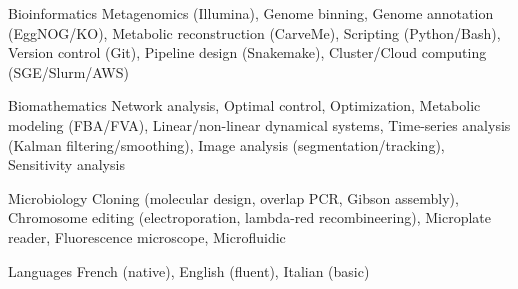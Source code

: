 

\begin{cvskills}

  \cvskill
    {Bioinformatics} %
    {Metagenomics (Illumina), Genome binning, Genome annotation (EggNOG/KO), Metabolic reconstruction (CarveMe), \linebreak Scripting (Python/Bash), Version control (Git), Pipeline design (Snakemake), Cluster/Cloud computing (SGE/Slurm/AWS)} %

  \cvskill
    {Biomathematics} %
    {Network analysis, Optimal control, Optimization, Metabolic modeling (FBA/FVA), Linear/non-linear dynamical systems, \linebreak Time-series analysis (Kalman filtering/smoothing), Image analysis (segmentation/tracking), Sensitivity analysis} %

  \cvskill
    {Microbiology} %
    {Cloning (molecular design, overlap PCR, Gibson assembly), Chromosome editing (electroporation, \linebreak lambda-red recombineering), Microplate reader, Fluorescence microscope, Microfluidic} %

  \cvskill
    {Languages} %
    {French (native), English (fluent), Italian (basic) } %

\end{cvskills}